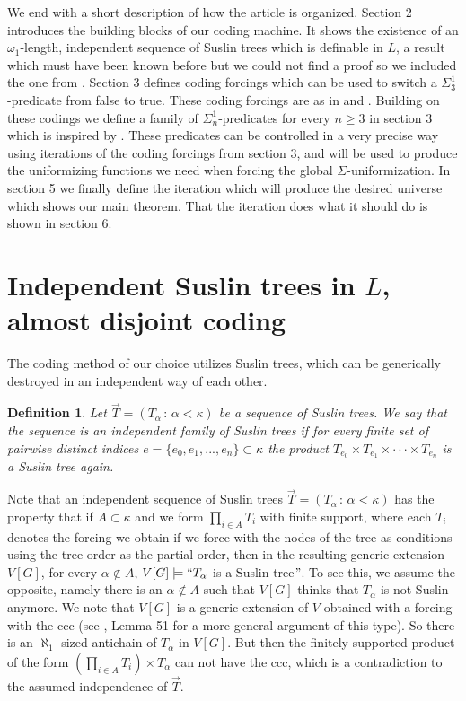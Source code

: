 \documentclass[a4paper,11pt]{article}
\newtheorem{definition}[theorem]{Definition}
\begin{document}
We end with a short description of how the article is organized. Section 2 introduces the building blocks of our coding machine. It shows the existence of an $\omega_1$-length, independent sequence of Suslin trees which is definable in $L$, a result which must have been known before but we could not find a proof so we included the one from \cite{A Failure of Reduction in the Presence of Separation}. Section 3 defines coding forcings which can be used to switch a $\Sigma^1_3$-predicate from false to true. These coding forcings are as in \cite{Ho2} and \cite{Ho4}. Building on these codings we define a family of $\Sigma^1_n$-predicates for every $n \ge 3$ in section 3 which is inspired by \cite{BPFA and Global Uniformization}. These predicates can be controlled in a very precise way using iterations of the coding forcings from section 3, and will be used to produce the uniformizing functions we need when forcing the global $\Sigma$-uniformization. In section 5 we finally define the iteration which will produce the desired universe which shows our main theorem. That the iteration does what it should do is shown in section 6. 


\section{Independent Suslin trees in $L$, almost disjoint coding}
The coding method of our choice utilizes Suslin trees, which can be generically destroyed in an independent way of each other. 
\begin{definition}
 Let $\vec{T} = (T_{\alpha} \, : \, \alpha < \kappa)$ be a sequence of Suslin trees. We say that the sequence is an 
 independent family of Suslin trees if for every finite set of pairwise distinct indices $e= \{e_0, e_1,...,e_n\} \subset \kappa$ the product $T_{e_0} \times T_{e_1} \times \cdot \cdot \cdot \times T_{e_n}$ 
 is a Suslin tree again.
\end{definition}
Note that an independent sequence of Suslin trees $\vec{T} = (T_{\alpha} \, : \, \alpha < \kappa)$ has the property that if $A \subset \kappa$ and we form 
$ \prod_{i \in A} T_i $
with finite support, where each $T_i$ denotes the forcing we obtain if we force with the nodes of the tree  as conditions using the tree order as the partial order, then in the resulting generic extension $V[G]$, for every $\alpha \notin A$, $V[G] \models `` T_{\alpha}$ is a Suslin tree$"$. To see this, we assume the opposite, namely there is an $\alpha \notin A$ such that $V[G]$ thinks that $T_{\alpha}$ is not Suslin anymore. We note that $V[G]$ is a generic extension of $V$ obtained with a forcing with the ccc (see \cite{Ho}, Lemma 51 for a more general argument of this type). So there is an $\aleph_1$-sized antichain of $T_{\alpha}$ in $V[G]$. But then the finitely supported product of the form $(\prod_{i \in A}  T_i )\times T_{\alpha}$ can not have the ccc, which is a contradiction to the  assumed independence of $\vec{T}$.
\end{document}
